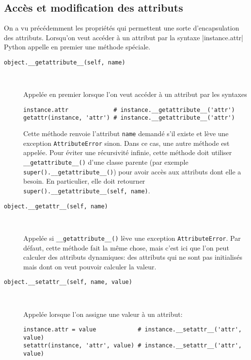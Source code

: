 \subsection{Accès et modification des attributs}
On a vu précédemment les propriétés qui permettent une sorte d'encapsulation des attributs. Lorsqu'on veut accéder à un attribut par la syntaxe |instance.attr| Python appelle en premier une méthode spéciale.

\begin{description}
    \item[\texttt{object.__getattribute__(self, name)}]~
    
    Appelée en premier lorsque l'on veut accéder à un attribut par les syntaxes
    \begin{verbatim}
instance.attr             # instance.__getattribute__('attr')
getattr(instance, 'attr') # instance.__getattribute__('attr')
    \end{verbatim} 
    Cette méthode renvoie l'attribut \texttt{name} demandé s'il existe et lève une exception \texttt{AttributeError} sinon. Dans ce cas, une autre méthode est appelée. Pour éviter une récursivité infinie, cette méthode doit utiliser \texttt{__getattribute__()} d'une classe parente (par exemple \texttt{super().__getattribute__()}) pour avoir accès aux attributs dont elle a besoin. En particulier, elle doit retourner \texttt{super().__getattribute__(self, name)}.

    \item[\texttt{object.__getattr__(self, name)}]~

    Appelée si \texttt{__getattribute__()} lève une exception \texttt{AttributeError}. Par défaut, cette méthode fait la même chose, mais c'est ici que l'on peut calculer des attributs dynamiques: des attributs qui ne sont pas initialisés mais dont on veut pouvoir calculer la valeur.

    \item[\texttt{object.__setattr__(self, name, value)}]~

Appelée lorsque l'on assigne une valeur à un attribut: 
    \begin{verbatim}
instance.attr = value            # instance.__setattr__('attr', value)
setattr(instance, 'attr', value) # instance.__setattr__('attr', value)
    \end{verbatim}
    

\end{description}
